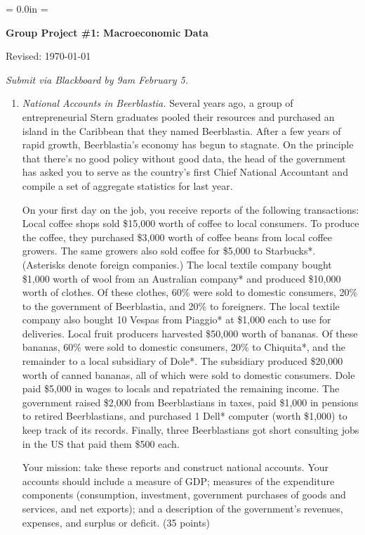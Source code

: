\documentclass[letterpaper,12pt]{article}
\def\HeadName{Group Project \#1}
\begin{document}
\parindent = 0.0in
\parskip = \bigskipamount
\thispagestyle{empty}%
\Head

\centerline{\large \bf \HeadName: Macroeconomic Data} 
\centerline{Revised:  \today}

\medskip
{\it Submit via Blackboard by 9am February 5.}

\begin{enumerate}
\item {\it National Accounts in Beerblastia.} 
Several years ago,
a group of entrepreneurial Stern graduates pooled their resources and
purchased an island in the Caribbean that they named Beerblastia.
After a few years of rapid growth, Beerblastia's economy has begun
to stagnate.  On the principle that there's no good policy without
good data, the head of the government has asked you to serve as
the country's first Chief National Accountant and compile a
set of aggregate statistics for last year.

On your first day on the job, you receive reports of the following
transactions: Local coffee shops sold \$15,000 worth of coffee to
local consumers. To produce the coffee, they purchased \$3,000
worth of coffee beans from local coffee growers. The same growers
also sold coffee for \$5,000 to Starbucks*. (Asterisks denote
foreign companies.) The local textile company bought \$1,000 worth
of wool from an Australian company* and produced \$10,000 worth of
clothes.  Of these clothes, 60\% were sold to domestic consumers,
20\% to the government of Beerblastia, and 20\% to foreigners. The
local textile company also bought 10 Vespas from Piaggio* at
\$1,000 each to use for deliveries. Local fruit producers
harvested \$50,000 worth of bananas. Of these bananas, 60\% were
sold to domestic consumers, 20\% to Chiquita*, and the remainder
to a local subsidiary of Dole*. The subsidiary produced \$20,000
worth of canned bananas, all of which were sold to domestic
consumers. Dole paid \$5,000 in wages to locals and repatriated
the remaining income.  The government raised \$2,000 from
Beerblastians in taxes, paid \$1,000 in pensions to retired
Beerblastians, and purchased 1 Dell* computer (worth \$1,000) to
keep track of its records. Finally, three Beerblastians got short
consulting jobs in the US that paid them \$500 each.

Your mission:  take these reports and construct national accounts.  
Your accounts should include a measure of
GDP;  measures of the expenditure components (consumption,
investment, government purchases of goods and services, and net
exports); and a description of the government's revenues,
expenses, and surplus or deficit.  (35 points)


\end{enumerate}
\end{document}
